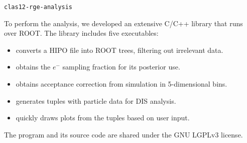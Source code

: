 \begin{frame}{\texttt{clas12-rge-analysis}}
    \label{11.11::clas12-rge-analysis}

    To perform the analysis, we developed an extensive C/C++ library that runs over ROOT.
    The library includes five executables:

    \vspace{12pt}

    \begin{itemize}
        \item
             converts a HIPO file into ROOT trees, filtering out irrelevant data.

        \vspace{3pt}
        \item
             obtains the $e^-$ sampling fraction for its posterior use.

        \vspace{3pt}
        \item
             obtains acceptance correction from simulation in 5-dimensional bins.

        \vspace{3pt}
        \item
             generates tuples with particle data for DIS analysis.

        \vspace{3pt}
        \item
             quickly draws plots from the tuples based on user input.
    \end{itemize}

    \vspace{24pt}

    The program and its source code are shared under the GNU LGPLv3 license.
\end{frame}

